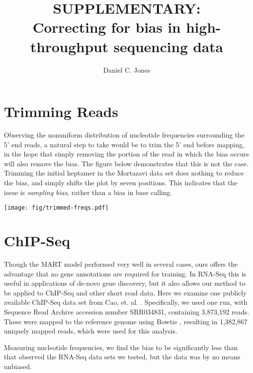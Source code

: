 \documentclass[letterpaper]{article}
\title{SUPPLEMENTARY:\\Correcting for bias in high-throughput sequencing data}
\author{Daniel C. Jones}
\begin{document}






\section{Trimming Reads}

Observing the nonuniform distribution of nucleotide frequencies surrounding the
5' end reads, a natural step to take would be to trim the 5' end before mapping,
in the hope that simply removing the portion of the read in which the bias
occurs will also remove the bias. The figure below demonstrates that this is not
the case. Trimming the initial heptamer in the Mortazavi data set does nothing to
reduce the bias, and simply shifts the plot by seven positions. This indicates
that the issue is \emph{sampling bias}, rather than a bias in base calling.


\begin{center}
\texttt{[image: fig/trimmed-freqs.pdf]}
\end{center}


\section{ChIP-Seq}

Though the MART model \cite{Li2010} performed very well in several cases, ours
offers the advantage that no gene annotations are required for training.  In
RNA-Seq this is useful in applications of de-novo gene discovery, but it also
allows our method to be applied to ChIP-Seq and other short read data. Here we
examine one publicly available ChIP-Seq data set from Cao, et. al.
\cite{Cao2010}. Specifically, we used one run, with Sequence Read Archive
accession number SRR034831, containing 3,873,192 reads. These were mapped to the
reference genome using Bowtie \cite{Langmead2009}, resulting in 1,382,867
uniquely mapped reads, which were used for this analysis.

Measuring nucleotide frequencies, we find the bias to be significantly less
than that observed the RNA-Seq data sets we tested, but the data was by no means
unbiased.
\end{document}
